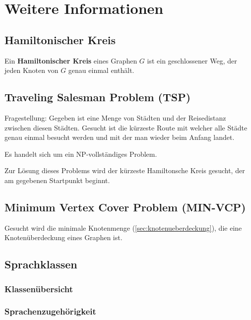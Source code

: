 \chapter{Weitere Informationen}
\section{Hamiltonischer Kreis}
Ein \textbf{Hamiltonischer Kreis} eines Graphen $G$ ist ein geschlossener Weg, der jeden Knoten von $G$ genau einmal enthält.

\section{Traveling Salesman Problem (TSP)}
Fragestellung: Gegeben ist eine Menge von Städten und der Reisedistanz zwischen diesen Städten. Gesucht ist die kürzeste Route mit welcher alle Städte genau einmal besucht werden und mit der man wieder beim Anfang landet.

Es handelt sich um ein NP-vollständiges Problem.

Zur Lösung dieses Problems wird der kürzeste Hamiltonsche Kreis gesucht, der am gegebenen Startpunkt beginnt.

\section{Minimum Vertex Cover Problem (MIN-VCP)}
Gesucht wird die minimale Knotenmenge (\ref{sec:knotenueberdeckung}), die eine Knotenüberdeckung eines Graphen ist.

\section{Sprachklassen}
\subsection{Klassenübersicht}

\subsection{Sprachenzugehörigkeit}
